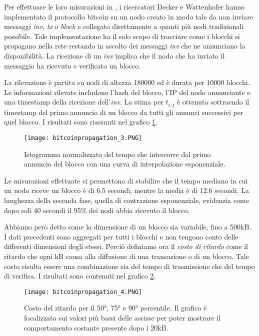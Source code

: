 Per effettuare le loro misurazioni in \cite{bitcoinpropagation}, i ricercatori Decker e Wattenhofer hanno implementato il protocollo bitcoin su un nodo creato in modo tale da non inviare messaggi \emph{inv}, \emph{tx} o \emph{block} e collegato  direttamente a quanti più nodi tradizionali possibile. Tale implementazione ha il solo scopo di tracciare come i blocchi si propagano nella rete restando in ascolto dei messaggi \emph{inv} che ne annunciano la disponibilità. La ricezione di un \emph{inv} implica che il nodo che ha inviato il messaggio ha ricevuto e verificato un blocco.

La rilevazione è partita su nodi di altezza 180000 ed è durata per 10000 blocchi. Le informazioni rilevate includono l'hash del blocco, l'IP del nodo annunciante e una timestamp della ricezione dell'\emph{inv}. La stima per $t_{i,j}$ è ottenuta sottraendo il timestamp del primo annuncio di un blocco da tutti gli annunci successivi per quel blocco. I risultati sono riassunti nel grafico \ref{bitcoinpropagation_3}.

\begin{figure}[htbp]
\centering
\texttt{[image: bitcoinpropagation\_3.PNG]}
\caption[Propagazione di blocchi]{Istogramma normalizzato del tempo che intercorre dal primo annuncio del blocco con una curva di interpolazione esponenziale.}
\label{bitcoinpropagation_3}
\end{figure}

Le misurazioni effettuate ci permettono di stabilire che il tempo mediano in cui un nodo riceve un blocco è di 6.5 secondi, mentre la media è di 12.6 secondi. La lunghezza della seconda fase, quella di contrazione esponenziale, evidenzia come dopo soli 40 secondi il 95\% dei nodi abbia ricevuto il blocco.

Abbiamo però detto come la dimensione di un blocco sia variabile, fino a 500kB. I dati precedenti sono aggregati per tutti i blocchi e non tengono conto delle differenti dimensioni degli stessi. Perciò definiamo ora il \emph{costo di ritardo} come il ritardo che ogni kB causa alla diffusione di una transazione o di un blocco. Tale costo risulta essere una combinazione sia del tempo di trasmissione che del tempo di verifica. I risultati sono contenuti nel grafico \ref{bitcoinpropagation_4}.

\begin{figure}[htbp]
\centering
\texttt{[image: bitcoinpropagation\_4.PNG]}
\caption[Costo del ritardo]{Costo del ritardo per il 50°, 75° e 90° percentile. Il grafico è focalizzato sui valori più bassi delle ascisse per poter mostrare il comportamento costante presente dopo i 20kB.}
\label{bitcoinpropagation_4}
\end{figure}

